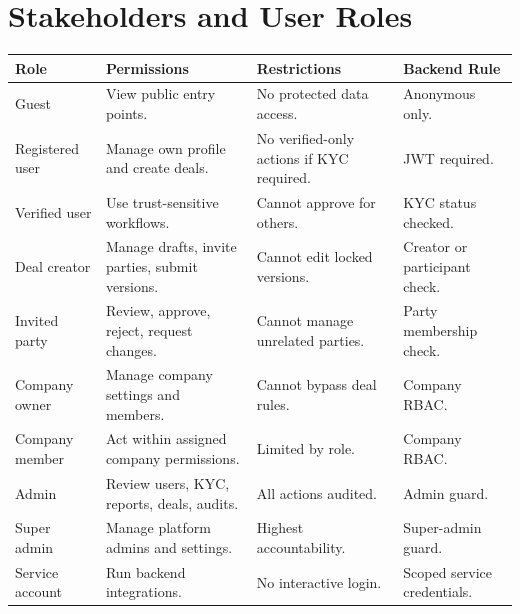 \chapter{Stakeholders and User Roles}
\begin{longtable}{p{}p{}p{}p{}}
\toprule
Role & Permissions & Restrictions & Backend Rule \\
\midrule
Guest & View public entry points. & No protected data access. & Anonymous only. \\
Registered user & Manage own profile and create deals. & No verified-only actions if KYC required. & JWT required. \\
Verified user & Use trust-sensitive workflows. & Cannot approve for others. & KYC status checked. \\
Deal creator & Manage drafts, invite parties, submit versions. & Cannot edit locked versions. & Creator or participant check. \\
Invited party & Review, approve, reject, request changes. & Cannot manage unrelated parties. & Party membership check. \\
Company owner & Manage company settings and members. & Cannot bypass deal rules. & Company RBAC. \\
Company member & Act within assigned company permissions. & Limited by role. & Company RBAC. \\
Admin & Review users, KYC, reports, deals, audits. & All actions audited. & Admin guard. \\
Super admin & Manage platform admins and settings. & Highest accountability. & Super-admin guard. \\
Service account & Run backend integrations. & No interactive login. & Scoped service credentials. \\
\bottomrule
\end{longtable}
